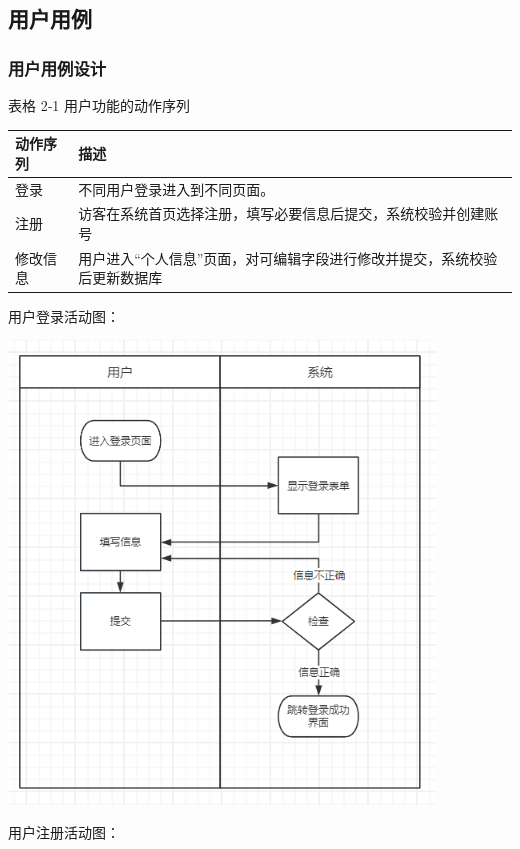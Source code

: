 \documentclass[]{article}
\begin{document}
\hypertarget{ux7528ux6237ux7528ux4f8b}{%
  \subsection{ 用户用例}\label{ux7528ux6237ux7528ux4f8b}}

\hypertarget{ux7528ux6237ux7528ux4f8bux8bbeux8ba1}{%
  \subsubsection{用户用例设计}\label{ux7528ux6237ux7528ux4f8bux8bbeux8ba1}}

\protect\hypertarget{_Toc153186375}{}{\protect\hypertarget{_Toc394245026}{}{}}表格
2‑1 用户功能的动作序列

\begin{longtable}[]{@{}ll@{}}
  \toprule
  动作序列 & 描述\tabularnewline
  \midrule
  \endhead
  登录   & 不同用户登录进入到不同页面。\tabularnewline
  注册   &
  访客在系统首页选择注册，填写必要信息后提交，系统校验并创建账号\tabularnewline
  修改信息 &
  用户进入``个人信息''页面，对可编辑字段进行修改并提交，系统校验后更新数据库\tabularnewline
  \bottomrule
\end{longtable}

用户登录活动图：

\includegraphics[width=4.45694in,height=4.83819in]{media/media/image1.png}

用户注册活动图：
\end{document}
